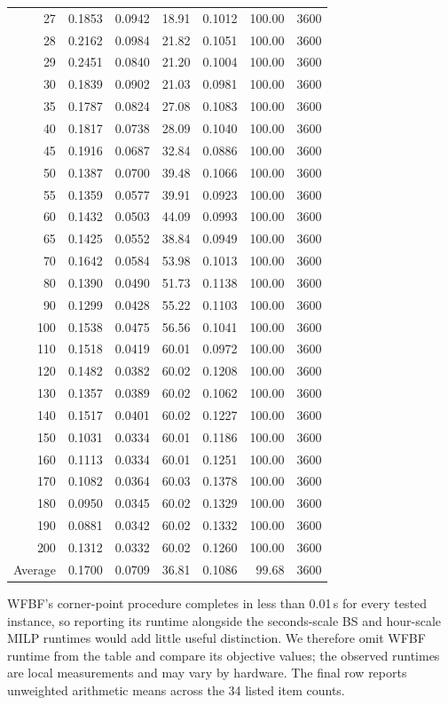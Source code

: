 \begin{table}[htbp]
\begin{tabular}{@{}r@{\quad}r@{\quad}rr@{\quad}rrr@{}}
27  & 0.1853 & 0.0942 & 18.91 & 0.1012 & 100.00 & 3600 \\
28  & 0.2162 & 0.0984 & 21.82 & 0.1051 & 100.00 & 3600 \\
29  & 0.2451 & 0.0840 & 21.20 & 0.1004 & 100.00 & 3600 \\
30  & 0.1839 & 0.0902 & 21.03 & 0.0981 & 100.00 & 3600 \\
35  & 0.1787 & 0.0824 & 27.08 & 0.1083 & 100.00 & 3600 \\
40  & 0.1817 & 0.0738 & 28.09 & 0.1040 & 100.00 & 3600 \\
45  & 0.1916 & 0.0687 & 32.84 & 0.0886 & 100.00 & 3600 \\
50  & 0.1387 & 0.0700 & 39.48 & 0.1066 & 100.00 & 3600 \\
55  & 0.1359 & 0.0577 & 39.91 & 0.0923 & 100.00 & 3600 \\
60  & 0.1432 & 0.0503 & 44.09 & 0.0993 & 100.00 & 3600 \\
65  & 0.1425 & 0.0552 & 38.84 & 0.0949 & 100.00 & 3600 \\
70  & 0.1642 & 0.0584 & 53.98 & 0.1013 & 100.00 & 3600 \\
80  & 0.1390 & 0.0490 & 51.73 & 0.1138 & 100.00 & 3600 \\
90  & 0.1299 & 0.0428 & 55.22 & 0.1103 & 100.00 & 3600 \\
100 & 0.1538 & 0.0475 & 56.56 & 0.1041 & 100.00 & 3600 \\
110 & 0.1518 & 0.0419 & 60.01 & 0.0972 & 100.00 & 3600 \\
120 & 0.1482 & 0.0382 & 60.02 & 0.1208 & 100.00 & 3600 \\
130 & 0.1357 & 0.0389 & 60.02 & 0.1062 & 100.00 & 3600 \\
140 & 0.1517 & 0.0401 & 60.02 & 0.1227 & 100.00 & 3600 \\
150 & 0.1031 & 0.0334 & 60.01 & 0.1186 & 100.00 & 3600 \\
160 & 0.1113 & 0.0334 & 60.01 & 0.1251 & 100.00 & 3600 \\
170 & 0.1082 & 0.0364 & 60.03 & 0.1378 & 100.00 & 3600 \\
180 & 0.0950 & 0.0345 & 60.02 & 0.1329 & 100.00 & 3600 \\
190 & 0.0881 & 0.0342 & 60.02 & 0.1332 & 100.00 & 3600 \\
200 & 0.1312 & 0.0332 & 60.02 & 0.1260 & 100.00 & 3600 \\
\hline
Average & 0.1700 & 0.0709 & 36.81 & 0.1086 & 99.68 & 3600 \\
\hline
\end{tabular}
\end{table}

WFBF's corner-point procedure completes in less than 0.01\,s for every
tested instance, so reporting its runtime alongside the seconds-scale BS
and hour-scale MILP runtimes would add little useful distinction. We
therefore omit WFBF runtime from the table and compare its objective values;
the observed runtimes are local measurements and may vary by hardware. The
final row reports unweighted arithmetic means across the 34 listed item
counts.
